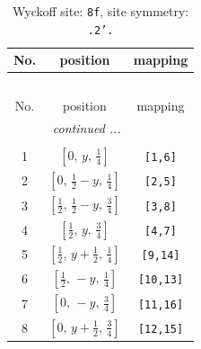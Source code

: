 \documentclass[fleqn,8pt]{jsarticle}
\begin{document}
\begin{longtable}{ccc}
\caption{Wyckoff site: {\tt 8f}, site symmetry: {\tt .2'.}}
 \\
 \hline \hline
No. & position & mapping \\ \hline \endfirsthead

\multicolumn{2}{l}{\tablename\ \thetable{}} \\
 \hline \hline
No. & position & mapping \\ \hline \endhead

 \hline \hline
\multicolumn{2}{r}{\footnotesize\it continued ...} \\ \endfoot

 \hline \hline
\multicolumn{2}{r}{} \\ \endlastfoot

1 & $\left[ 0,\, y,\, \frac{1}{4} \right]$ & {\tt [1,6]} \\ \hline
2 & $\left[ 0,\, \frac{1}{2} - y,\, \frac{1}{4} \right]$ & {\tt [2,5]} \\ \hline
3 & $\left[ \frac{1}{2},\, \frac{1}{2} - y,\, \frac{3}{4} \right]$ & {\tt [3,8]} \\ \hline
4 & $\left[ \frac{1}{2},\, y,\, \frac{3}{4} \right]$ & {\tt [4,7]} \\ \hline
5 & $\left[ \frac{1}{2},\, y + \frac{1}{2},\, \frac{1}{4} \right]$ & {\tt [9,14]} \\ \hline
6 & $\left[ \frac{1}{2},\, - y,\, \frac{1}{4} \right]$ & {\tt [10,13]} \\ \hline
7 & $\left[ 0,\, - y,\, \frac{3}{4} \right]$ & {\tt [11,16]} \\ \hline
8 & $\left[ 0,\, y + \frac{1}{2},\, \frac{3}{4} \right]$ & {\tt [12,15]} \\
\end{longtable}
\renewcommand{\arraystretch}{1.2}
\end{document}
